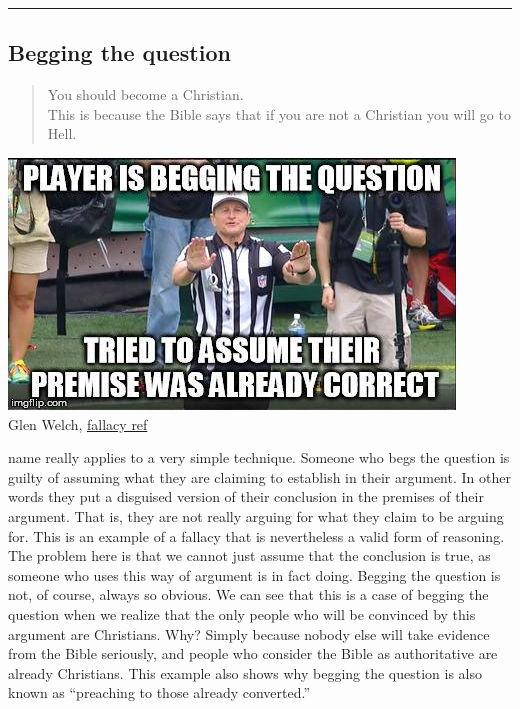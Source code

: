 \documentclass[justified]{tufte-book}
\newenvironment{argument}{\begin{quote}\normalsize}{\end{quote}}
\begin{document}
\begin{center}\rule{0.5\linewidth}{\linethickness}\end{center}

\hypertarget{begging-the-question}{%
\subsection*{Begging the question}\label{begging-the-question}}

\begin{argument}
You should become a Christian.\\
This is because the Bible says that if you are not a Christian you will
go to Hell.
\end{argument}

\begin{marginfigure}
\includegraphics{img/fallacies/begging-question.jpg}\\
Glen Welch, \href{https://twitter.com/fallacy_ref?lang=en}{fallacy ref}
\end{marginfigure}

 name really applies to a very simple technique. Someone who begs the question is guilty of assuming what they are claiming to establish in their argument. In other words they put a disguised version of their conclusion in the premises of their argument. That is, they are not really arguing for what they claim to be arguing for. This is an example of a fallacy that is nevertheless a valid form of reasoning. The problem here is that we cannot just assume that the conclusion is true, as someone who uses this way of argument is in fact doing. Begging the question is not, of course, always so obvious. We can see that this is a case of begging the question when we realize that the only people who will be convinced by this argument are Christians. Why? Simply because nobody else will take evidence from the Bible seriously, and people who consider the Bible as authoritative are already Christians. This example also shows why begging the question is also known as ``preaching to those already converted.''
\end{document}
